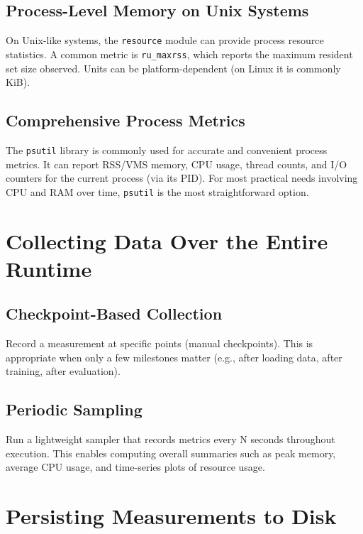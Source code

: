 \documentclass{article}
\begin{document}
        \subsection{Process-Level Memory on Unix Systems}
            On Unix-like systems, the \texttt{resource} module can provide process resource statistics.
            A common metric is \texttt{ru\_maxrss}, which reports the maximum resident set size observed.
            Units can be platform-dependent (on Linux it is commonly KiB).
        
        \subsection{Comprehensive Process Metrics}
            The \texttt{psutil} library is commonly used for accurate and convenient process metrics.
            It can report RSS/VMS memory, CPU usage, thread counts, and I/O counters for the current process (via its PID).
            For most practical needs involving CPU and RAM over time, \texttt{psutil} is the most straightforward option.
    
    
    \section{Collecting Data Over the Entire Runtime}
        
        \subsection{Checkpoint-Based Collection}
            Record a measurement at specific points (manual checkpoints).
            This is appropriate when only a few milestones matter (e.g., after loading data, after training, after evaluation).
        
        \subsection{Periodic Sampling}
            Run a lightweight sampler that records metrics every N seconds throughout execution.
            This enables computing overall summaries such as peak memory, average CPU usage, and time-series plots of resource usage.
    
    
    \section{Persisting Measurements to Disk}
        
\end{document}
